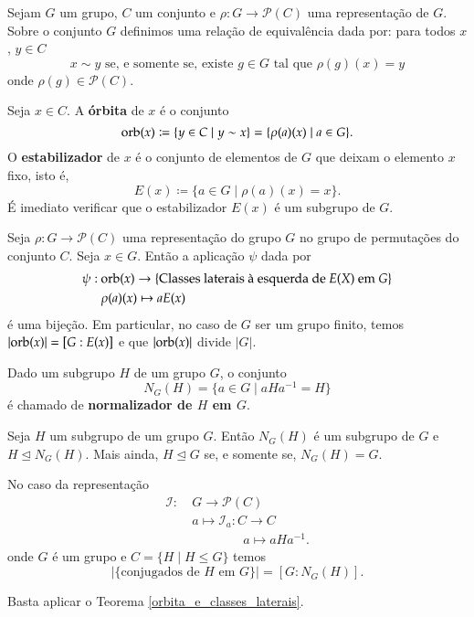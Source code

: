 Sejam $G$ um grupo, $C$ um conjunto e $\rho : G \to \mathcal{P}(C)$ uma representa\c{c}\~ao de $G$. Sobre o conjunto $G$ definimos uma rela\c{c}\~ao de equival\^encia dada por: para todos $x$, $y \in C$
\[
	x \sim y \mbox{ se, e somente se, existe } g \in G \mbox{ tal que } \rho(g)(x) = y
\]
onde $\rho(g) \in \mathcal{P}(C)$.

\begin{definicao}
	Seja $x \in C$. A \textbf{\'orbita} de $x$ \'e o conjunto
	\[
		{\rm orb}(x) \coloneqq \{y \in C \mid y \sim x\} = \{\rho(a)(x) \mid a \in G\}.
	\]
	O \textbf{estabilizador} de $x$ \'e o conjunto de elementos de $G$ que deixam o elemento $x$ fixo, isto \'e,
	\[
		E(x) \coloneqq \{a \in G \mid \rho(a)(x) = x\}.
	\]
	\'E imediato verificar que o estabilizador $E(x)$ \'e um subgrupo de $G$.
\end{definicao}

\begin{teorema}\label{orbita_e_classes_laterais}
	Seja $\rho : G \to \mathcal{P}(C)$ uma representa\c{c}\~ao do grupo $G$ no grupo de permuta\c{c}\~oes do conjunto $C$. Seja $x \in G$. Ent\~ao a aplica\c{c}\~ao $\psi$ dada por
	\begin{align}
		\psi:\ &{\rm orb}(x) \to \{\mbox{Classes laterais \`a esquerda de } E(X) \mbox{ em } G\}\\
		&\rho(a)(x) \mapsto aE(x)
	\end{align}
	\'e uma bije\c{c}\~ao. Em particular, no caso de $G$ ser um grupo finito, temos $|{\rm orb}(x)| = [G : E(x)]$ e que $|{\rm orb}(x)|$ divide $|G|$.
\end{teorema}

\begin{definicao}
	Dado um subgrupo $H$ de um grupo $G$, o conjunto
	\[
		N_G(H) = \{a \in G \mid aHa^{-1} = H\}
	\]
	\'e chamado de \textbf{normalizador de $H$ em $G$}.
\end{definicao}

\begin{proposicao}
	Seja $H$ um subgrupo de um grupo $G$. Ent\~ao $N_G(H)$ \'e um subgrupo de $G$ e $H \unlhd N_G(H)$. Mais ainda, $H \unlhd G$ se, e somente se, $N_G(H) = G$.
\end{proposicao}

\begin{lema}\label{numero_de_subgrupos_conjugados}
	No caso da representa\c{c}\~ao
	\begin{align*}
		\mathcal{I} :\ &G \to \mathcal{P}(C)\\
		&a \mapsto \mathcal{I}_a : C \to C\\
		& \qquad \qquad a \mapsto aHa^{-1}.
	\end{align*}
onde $G$ \'e um grupo e $C = \{H \mid H \le G\}$ temos
\[
	|\{\mbox{conjugados de } H \mbox{ em } G\}| = [G : N_G(H)].
\]	
\end{lema}
\begin{prova}
	Basta aplicar o Teorema \ref{orbita_e_classes_laterais}.
\end{prova}


